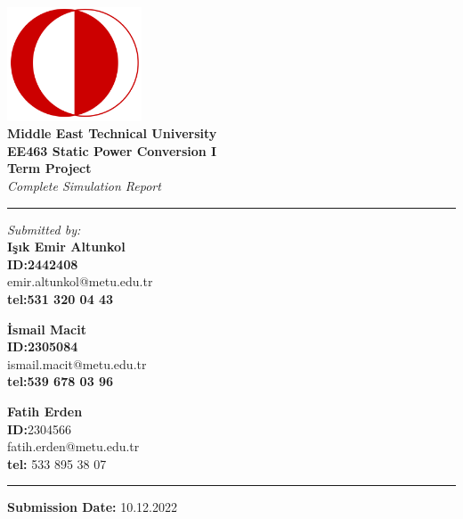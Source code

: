 \begin{titlepage}

\begin{center}

\includegraphics[width=0.3\textwidth]{Figures/metu_logo.png}\\
\vspace{.3in}
\textup{{\bf Middle East Technical University}}\\

\Large \textbf{EE463 Static Power Conversion I}\\[0.3in]
\Large \textbf{Term Project}\\
\Large \textit{Complete Simulation Report}\\

\noindent\rule{6cm}{0.4pt}

\normalsize \textit{Submitted by:} \\

\textbf{Işık Emir Altunkol}\\
\textbf{ID:2442408}\\
emir.altunkol@metu.edu.tr\\
\textbf{tel:531 320 04 43} \\

\vspace{.3in}

\textbf{İsmail Macit}\\
\textbf{ID:2305084}\\
ismail.macit@metu.edu.tr\\
\textbf{tel:539 678 03 96} \\

\vspace{.3in}

\textbf{Fatih Erden}\\
\textbf{ID:}2304566\\
fatih.erden@metu.edu.tr\\
\textbf{tel:} 533 895 38 07\\

\noindent\rule{6cm}{0.4pt}

\vspace{.3in}

\textbf{Submission Date:} 10.12.2022

\end{center}

\end{titlepage}